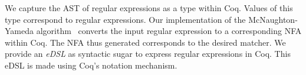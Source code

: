 \documentclass{article}
\begin{document}
%

We capture the AST of regular expressions as a type within Coq.
Values of this type correspond to regular expressions.
%
Our implementation of the McNaughton-Yameda
algorithm~\cite{mcnaughton1960regular} converts the input regular
expression to a corresponding NFA within Coq.
%
%
The NFA thus generated corresponds to the desired matcher.
%
We provide an \emph{\gls{eDSL}} as syntactic sugar to express regular
expressions in Coq.
%
This \gls{eDSL} is made using Coq's notation mechanism.
%
\end{document}
